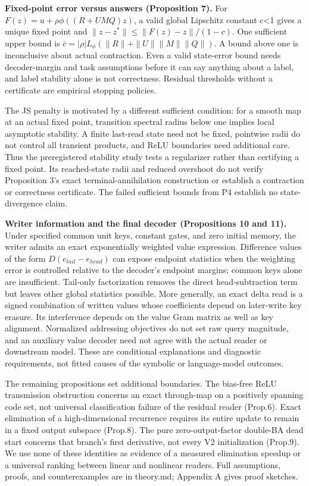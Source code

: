 \textbf{Fixed-point error versus answers (Proposition 7).} For
\(F(z)=u+\rho\phi((R+UMQ)z)\), a valid global Lipschitz constant c<1 gives a unique
fixed point and \(\|z-z^*\|\le\|F(z)-z\|/(1-c)\). One sufficient upper bound is
\(\bar c=|\rho|L_\phi(\|R\|+\|U\|\|M\|\|Q\|)\).
A bound above one is inconclusive about actual contraction. Even a valid state-error
bound needs decoder-margin and task assumptions before it can say anything about a
label, and label stability alone is not correctness. Residual thresholds without a
certificate are empirical stopping policies.

The JS penalty is motivated by a different sufficient condition: for a smooth map
at an actual fixed point, transition spectral radius below one implies local
asymptotic stability. A finite last-read state need not be fixed, pointwise radii
do not control all transient products, and ReLU boundaries need additional care.
Thus the preregistered stability study tests a regularizer rather
than certifying a fixed point. Its reached-state radii and reduced overshoot do not
verify Proposition 3’s exact terminal-annihilation construction or establish a
contraction or correctness certificate. The failed sufficient  %
bounds from P4 establish no state-divergence claim.  %

\textbf{Writer information and the final decoder (Propositions 10 and 11).} Under specified
common unit keys, constant gates, and zero initial memory, the writer admits an exact
exponentially weighted value expression. Difference values of the form
\(D(e_{tail}-e_{head})\) can expose endpoint statistics when the weighting error is
controlled relative to the decoder’s endpoint margins; common keys alone are
insufficient. Tail-only factorization removes the direct head-subtraction term but
leaves other global statistics possible. More generally, an exact delta read is a
signed combination of written values whose coefficients depend on later-write key
erasure. Its interference depends on the value Gram matrix as well as key alignment.
Normalized addressing objectives do not set raw query magnitude, and an auxiliary
value decoder need not agree with the actual reader or downstream model. These are
conditional explanations and diagnostic requirements, not fitted causes of the
symbolic or language-model outcomes.

The remaining propositions set additional boundaries. The bias-free ReLU transmission
obstruction concerns an exact through-map on a positively spanning code set, not
universal classification failure of the residual reader (Prop.6). Exact elimination
of a high-dimensional recurrence requires its entire update to remain in a fixed
output subspace (Prop.8). The pure zero-output-factor double-BA dead start concerns
that branch’s first derivative, not every V2 initialization (Prop.9). We use none of
these identities as evidence of a measured elimination speedup or a universal ranking
between linear and nonlinear readers. Full assumptions, proofs, and counterexamples
are in theory.md; Appendix A gives proof sketches.

